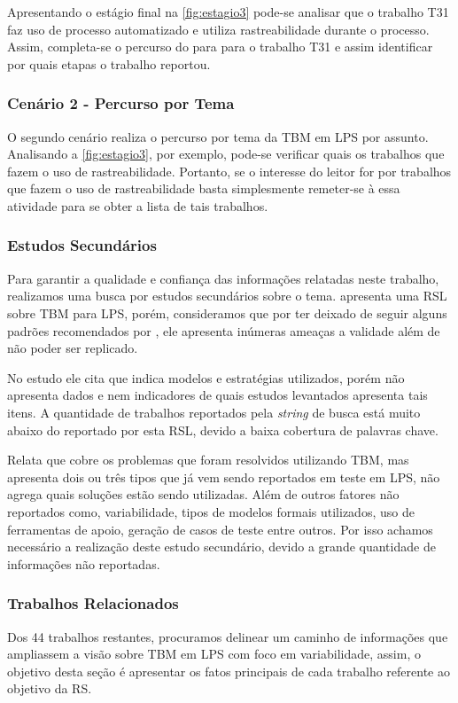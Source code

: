 Apresentando o estágio final na \ref{fig:estagio3} pode-se analisar que o trabalho T31 faz uso de processo automatizado e utiliza rastreabilidade durante o processo. Assim, completa-se o percurso do para para o trabalho T31 e assim identificar por quais etapas o trabalho reportou.

\subsubsection{Cenário 2 - Percurso por Tema}
O segundo cenário realiza o percurso por tema da TBM em LPS por assunto. Analisando a \ref{fig:estagio3}, por exemplo, pode-se verificar quais os trabalhos que fazem o uso de rastreabilidade. Portanto, se o interesse do leitor for por trabalhos que fazem o uso de rastreabilidade basta simplesmente remeter-se à essa atividade para se obter a lista de tais trabalhos.



\subsubsection{Estudos Secundários}
Para garantir a qualidade e confiança das informações relatadas neste trabalho, realizamos uma busca por estudos secundários sobre o tema. 
\cite{isa2017model} apresenta uma RSL sobre TBM para LPS, porém, consideramos que por ter deixado de seguir alguns padrões recomendados por \cite{kitchenham2004procedures}, ele apresenta inúmeras ameaças a validade além de não poder ser replicado. 

No estudo ele cita que indica modelos e estratégias utilizados, porém não apresenta dados e nem indicadores de quais estudos levantados apresenta tais itens. A quantidade de trabalhos reportados pela \textit{string} de busca está muito abaixo do reportado por esta RSL, devido a baixa cobertura de palavras chave.

Relata que cobre os problemas que foram resolvidos utilizando TBM, mas apresenta dois ou três tipos que já vem sendo reportados em teste em LPS, não agrega quais soluções estão sendo utilizadas. Além de outros fatores não reportados como, variabilidade, tipos de modelos formais utilizados, uso de ferramentas de apoio, geração de casos de teste entre outros. Por isso achamos necessário a realização deste estudo secundário, devido a grande quantidade de informações não reportadas.

\subsubsection{Trabalhos Relacionados}
Dos 44 trabalhos restantes, procuramos delinear um caminho de informações que ampliassem a visão sobre TBM em LPS com foco em variabilidade, assim, o objetivo desta seção é apresentar os fatos principais de cada trabalho referente ao objetivo da RS.

